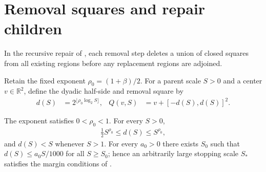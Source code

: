 \section{Removal squares and repair children}
\label{sec:area_law_simultaneous_repair}

In the recursive repair of \cite[Section~11]{OpenAI2026AreaLaw}, each
removal step deletes a union of closed squares from all existing regions
before any replacement regions are adjoined.


\begin{definition}
    \label{def:area_law_repair_square}
    \leanok
    Retain the fixed exponent $\rho_0=(1+\beta)/2$. For a parent scale
    $S>0$ and a center $v\in\mathbb R^2$, define the dyadic half-side and
    removal square by
    \begin{align}
        d(S)   & =2^{\lfloor\rho_0\log_2 S\rfloor}, &
        Q(v,S) & =v+[-d(S),d(S)]^2.
        \label{eq:area_law_repair_square}
    \end{align}
\end{definition}

\begin{lemma}
    \label{thm:area_law_repair_margins}
    \leanok
    The exponent satisfies $0<\rho_0<1$. For every $S>0$,
    \begin{align}
        \tfrac12S^{\rho_0}\le d(S)\le S^{\rho_0},
        \label{eq:area_law_repair_margins}
    \end{align}
    and $d(S)<S$ whenever $S>1$. For every $a_0>0$ there exists $S_0$ such
    that $d(S)\le a_0S/1000$ for all $S\ge S_0$; hence an arbitrarily large
    stopping scale $S_*$ satisfies the margin conditions of
    \cite[Section~11]{OpenAI2026AreaLaw}.
\end{lemma}

